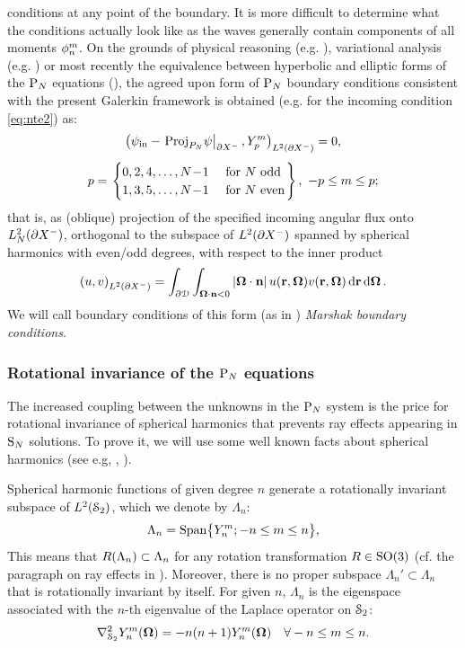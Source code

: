 conditions at any point of the boundary. It is more difficult to determine what the conditions actually look like as the
waves generally contain components of all moments $\angmom{n}{m}$. On the grounds of physical reasoning
(e.g. \cite{Rumyantsev}), variational analysis (e.g. \cite{Davis}) or most recently the equivalence between hyperbolic
and elliptic forms of the $\PN$ equations (\cite{Sanchez8}), the agreed upon form of $\PN$ boundary conditions
consistent with the present Galerkin framework is obtained (e.g. for the incoming condition \eqref{eq:nte2}) as:
$$
\begin{gathered}
	\left(\psi_\text{in} - \left.\Projop[P_N]\!\psi\right\vert_{\pX[-]}, \Y{p}{m} \right)_{\Lp[2](\pX[-])} = 0,\\[.35em] 
	p = 
	\left.\begin{cases}
		0,2,4,\ldots,N\!-\!1 & \mbox{ for $N$ odd}\\
		1,3,5,\ldots,N\!-\!1 & \mbox{ for $N$ even}	
	\end{cases}\right\},\ -p \leq m \leq p;
\end{gathered}
$$
that is, as (oblique) projection of the specified incoming angular flux onto $\Lp[2]_N(\pX[-])$, orthogonal
to the subspace of $\Lp[2](\pX[-])$ spanned by spherical harmonics with even/odd degrees, with respect to the inner product
$$
	\left(u,v\right)_{\Lp[2](\pX[-])} = \int_{\pV}\int_{\bomega\cdot\bn < 0}\abs{\bomega\cdot\bn}
	u(\br,\bomega)v(\br,\bomega)\,\d{\br}\d{\bomega}.
$$
We will call boundary conditions of this form (as in \cite{Davis}) \textit{Marshak boundary conditions}.


\subsubsection{Rotational invariance of the $\PN$ equations}\label{sec:dirinvPN}
The increased coupling between the unknowns in the $\PN$ system is the price for rotational invariance of spherical
harmonics that prevents ray effects appearing in $\SN$ solutions. To prove it, we will use some well known facts about
spherical harmonics (see e.g, \cite[Chap.
3]{Sansone}, \cite[Sec. 3.9]{Schreiner}). 

Spherical harmonic functions of given degree $n$ generate a rotationally invariant subspace
of $\Lp[2](\Sphere)$, which we denote by $\Lambda_n$:
\begin{equation}
	\label{eq:subspace}
    	\Lambda_n = \text{Span}\bigl\{\Y{n}{m}; -n \leq m \leq n\bigr\},
\end{equation}
This means that $\op{R}(\Lambda_n) \subset \Lambda_n$ for any rotation transformation $\op{R}\in\mathrm{SO}(3)$ (cf. the
paragraph on ray effects in ). Moreover, there is no proper subspace $\Lambda_n' \subset \Lambda_n$ that
is rotationally invariant by itself. For given $n$, $\Lambda_n$ is the eigenspace associated with
the $n$-th eigenvalue of the Laplace operator on $\Sphere$:
$$
	\lap_{\Sphere} \Y{n}{m}(\bomega) = -n(n+1)\Y{n}{m}(\bomega) \quad \forall -n \leq m \leq n.
$$

